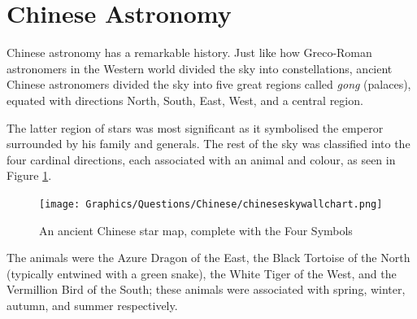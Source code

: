\documentclass[a4paper,11pt,draft]{exam}
\begin{document}
\newpage
\section{Chinese Astronomy}
Chinese astronomy has a remarkable history. Just like how Greco-Roman astronomers in the Western world divided the sky into constellations, ancient Chinese astronomers divided the sky into five great regions called \textit{gong} (palaces), equated with directions North, South, East, West, and a central region. 

The latter region of stars was most significant as it symbolised the emperor surrounded by his family and generals. The rest of the sky was classified into the four cardinal directions, each associated with an animal and colour, as seen in Figure \ref{q5}.
\begin{figure}[H]
	\centering
	\texttt{[image: Graphics/Questions/Chinese/chineseskywallchart.png]}
	\caption{An ancient Chinese star map, complete with the Four Symbols}
	\label{q5}
\end{figure}
The animals were the Azure Dragon of the East, the Black Tortoise of the North (typically entwined with a green snake), the White Tiger of the West, and the Vermillion Bird of the South; these animals were associated with spring, winter, autumn, and summer respectively.
\end{document}
